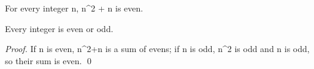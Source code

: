 \begin{theorem}
For every integer n, n^2 + n is even.
\end{theorem}
\begin{lemma}
Every integer is even or odd.
\end{lemma}
\begin{proof}
If n is even, n^2+n is a sum of evens; if n is odd, n^2 is odd and
n is odd, so their sum is even. \qed
\end{proof}
